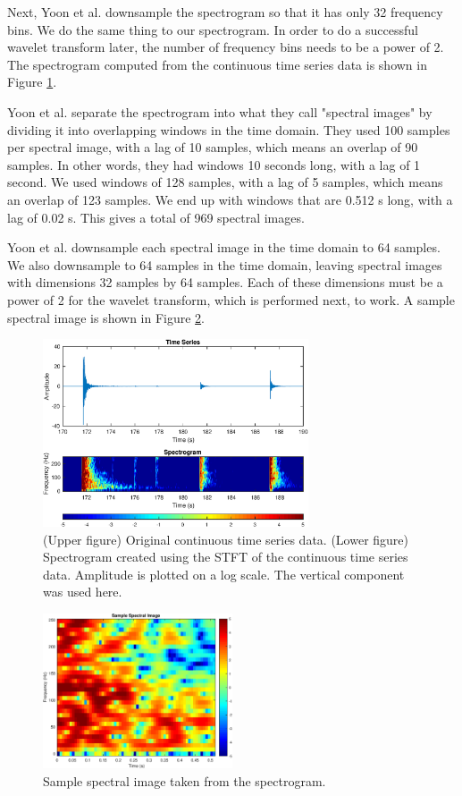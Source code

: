 Next, Yoon et al. downsample the spectrogram so that it has only 32 frequency bins. We do the same thing to our spectrogram. In order to do a successful wavelet transform later, the number of frequency bins needs to be a power of 2. The spectrogram computed from the continuous time series data is shown in Figure \ref{fig:spec}.

Yoon et al. separate the spectrogram into what they call "spectral images" by dividing it into overlapping windows in the time domain. They used 100 samples per spectral image, with a lag of 10 samples, which means an overlap of 90 samples. In other words, they had windows 10 seconds long, with a lag of 1 second. We used windows of 128 samples, with a lag of 5 samples, which means an overlap of 123 samples. We end up with windows that are 0.512 s long, with a lag of 0.02 s. This gives a total of 969 spectral images.

Yoon et al. downsample each spectral image in the time domain to 64 samples. We also downsample to 64 samples in the time domain, leaving spectral images with dimensions 32 samples by 64 samples. Each of these dimensions must be a power of 2 for the wavelet transform, which is performed next, to work. 
A sample spectral image is shown in Figure \ref{fig:specim}. 
\begin{figure}
	\centering
\includegraphics[width=0.7\textwidth]{sampleSpectrogram}
\caption{(Upper figure) Original continuous time series data. (Lower figure) Spectrogram created using the STFT of the continuous time series data. Amplitude is plotted on a log scale. The vertical component was used here.}
\label{fig:spec}
\end{figure}

\begin{figure}
	\centering
\includegraphics[width=0.5\textwidth]{sampleSpectralImage}
\caption{Sample spectral image taken from the spectrogram.}
\label{fig:specim}
\end{figure}
